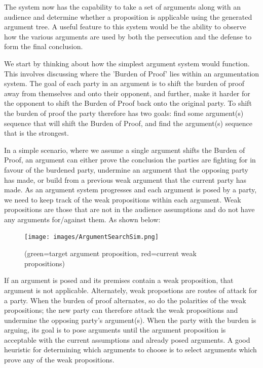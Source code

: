 \documentclass[10pt,a4paper,twocolumn]{article}
\begin{document}
The system now has the capability to take a set of arguments along with an audience and
determine whether a proposition is applicable using the generated argument tree.
A useful feature to this system would be the ability to observe how the various
arguments are used by both the persecution and the defense to form the final
conclusion.

We start by thinking about how the simplest argument system would function. This
involves discussing where the 'Burden of Proof' lies within an argumentation
system. The goal of each party in an argument is to shift the burden of proof
away from themselves and onto their opponent, and further, make it harder for
the opponent to shift the Burden of Proof back onto the original party. To
shift the burden of proof the party therefore has two goals: find some
argument(s) sequence that will shift the Burden of Proof, and find the
argument(s) sequence that is the strongest. 

In a simple scenario, where we assume a single argument shifts the Burden of
Proof, an argument can either prove the conclusion the parties are fighting for
in favour of the burdened party, undermine an argument that the opposing party
has made, or build from a previous weak argument that the current party has
made. As an argument system progresses and each argument is posed by a party, we
need to keep track of the weak propositions within each argument. Weak
propositions are those that are not in the audience assumptions and do not have
any arguments for/against them. As shown below:

\begin{figure}[h]
  \texttt{[image: images/ArgumentSearchSim.png]}
  \centering
  \caption{(green=target argument proposition, red=current weak
  propositions)}

\end{figure}

If an argument is posed and its premises contain
a weak proposition, that argument is not applicable. Alternately, weak
propostions are routes of attack for a party. When the burden of proof
alternates, so do the polarities of the weak propositions; the new party can
therefore attack the weak propositions and undermine the opposing party's
argument(s). When the party with the burden is arguing, its goal is to pose
arguments until the argument proposition is acceptable with the current
assumptions and already posed arguments. A good heuristic for determining which
arguments to choose is to select arguments which prove any of the weak
propositions.
\end{document}
